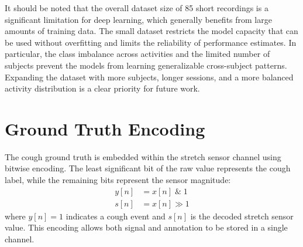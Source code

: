 It should be noted that the overall dataset size of 85 short recordings is a significant limitation for deep learning, which generally benefits from large amounts of training data. The small dataset restricts the model capacity that can be used without overfitting and limits the reliability of performance estimates. In particular, the class imbalance across activities and the limited number of subjects prevent the models from learning generalizable cross-subject patterns. Expanding the dataset with more subjects, longer sessions, and a more balanced activity distribution is a clear priority for future work.

\section{Ground Truth Encoding}

The cough ground truth is embedded within the stretch sensor channel using bitwise encoding. The least significant bit of the raw value represents the cough label, while the remaining bits represent the sensor magnitude:
\begin{align}
y[n] &= x[n] \;\&\; 1 \label{eq:label} \\
s[n] &= x[n] \gg 1 \label{eq:stretch}
\end{align}
where $y[n] = 1$ indicates a cough event and $s[n]$ is the decoded stretch sensor value. This encoding allows both signal and annotation to be stored in a single channel.
